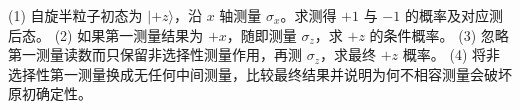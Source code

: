 (1) 自旋半粒子初态为 \(|+z\rangle\)，沿 \(x\) 轴测量 \(\sigma_x\)。求测得 \(+1\) 与 \(-1\) 的概率及对应测后态。
(2) 如果第一测量结果为 \(+x\)，随即测量 \(\sigma_z\)，求 \(+z\) 的条件概率。
(3) 忽略第一测量读数而只保留非选择性测量作用，再测 \(\sigma_z\)，求最终 \(+z\) 概率。
(4) 将非选择性第一测量换成无任何中间测量，比较最终结果并说明为何不相容测量会破坏原初确定性。
